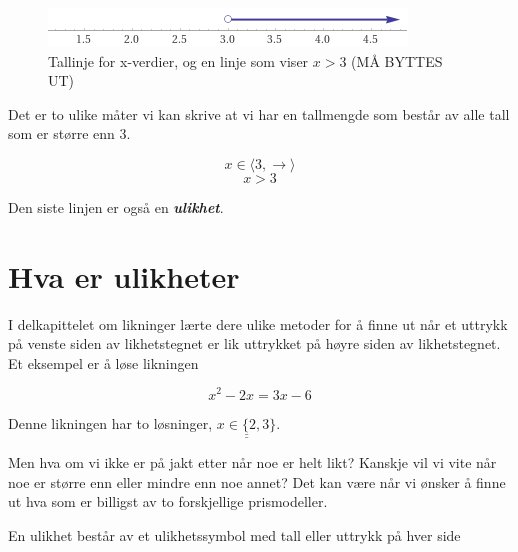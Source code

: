 \documentclass[
  letterpaper,
  DIV=11,
  numbers=noendperiod]{scrartcl}
\theoremstyle{definition}
\theoremstyle{definition}
\theoremstyle{remark}
\begin{document}
\begin{figure}

{\centering \includegraphics{Ulikheter_files/figure-pdf/fc7afa46-86dd-495e-9f39-4d4179823626-1-b51f81c9-1396-4a7a-9aed-a45061c5f20a.png}

}

\caption{Tallinje for x-verdier, og en linje som viser \(x>3\) (MÅ
BYTTES UT)}

\end{figure}

Det er to ulike måter vi kan skrive at vi har en tallmengde som består
av alle tall som er større enn 3.

\[ x\in\langle 3, \rightarrow\rangle\] \[x \gt 3 \]

Den siste linjen er også en \textbf{\emph{ulikhet}}.

\hypertarget{sec-ulikheter}{%
\section{Hva er ulikheter}\label{sec-ulikheter}}

I delkapittelet om likninger lærte dere ulike metoder for å finne ut når
et uttrykk på venste siden av likhetstegnet er lik uttrykket på høyre
siden av likhetstegnet. Et eksempel er å løse likningen

\[x^2-2x=3x-6\]

Denne likningen har to løsninger,
\(\underline{\underline{x\in\{2, 3\}}}\).

Men hva om vi ikke er på jakt etter når noe er helt likt? Kanskje vil vi
vite når noe er større enn eller mindre enn noe annet? Det kan være når
vi ønsker å finne ut hva som er billigst av to forskjellige
prismodeller.

\begin{tcolorbox}[enhanced jigsaw, colframe=quarto-callout-note-color-frame, title=\textcolor{quarto-callout-note-color}{\faInfo}\hspace{0.5em}{Ulikhet}, left=2mm, bottomtitle=1mm, coltitle=black, toprule=.15mm, leftrule=.75mm, opacityback=0, rightrule=.15mm, opacitybacktitle=0.6, breakable, toptitle=1mm, titlerule=0mm, arc=.35mm, bottomrule=.15mm, colbacktitle=quarto-callout-note-color!10!white, colback=white]

En ulikhet består av et ulikhetssymbol med tall eller uttrykk på hver
side

\end{tcolorbox}
\end{document}
